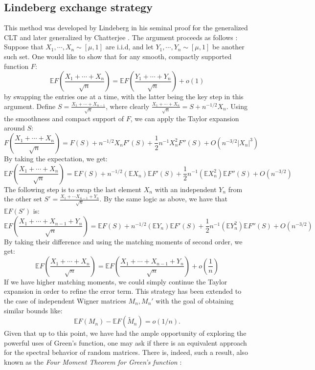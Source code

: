 \documentclass[11pt]{article}
\begin{document}
\subsection{Lindeberg exchange strategy}
This method was developed by Lindeberg in his seminal proof for the generalized CLT \cite{lindeberg} and later generalized by Chatterjee \cite{chatterjee}. The argument proceeds as follows \cite{tao}: Suppose that $X_1, \cdots, X_n\sim [\mu, 1]$ are i.i.d, and let $Y_1, \cdots, Y_n\sim[\mu, 1]$ be another such set. One would like to show that for any smooth, compactly supported function $F$: $$\mathbb{E}F\left(\frac{X_1+\cdots+X_n}{\sqrt{n}}\right) = \mathbb{E}F\left(\frac{Y_1+\cdots+Y_n}{\sqrt{n}}\right)+o(1)$$
by swapping the entries one at a time, with the latter being the key step in this argument.  Define
$S= \frac{X_1+\cdots+X_{n-1}}{\sqrt{n}}$, where clearly $ \frac{X_1+\cdots+X_n}{\sqrt{n}}=S+n^{-1/2}X_n $. Using the smoothness and compact support of $F$, we can apply the Taylor expansion around $S$: $$F\left(\frac{X_1+\cdots+X_n}{\sqrt{n}}\right)=F(S)+n^{-1/2}X_nF'(S)+\frac{1}{2}n^{-1}X_n^2 F''(S) + O(n^{-3/2}|X_n|^3)$$
By taking the expectation, we get: 
$$ \mathbb{E}F\left(\frac{X_1+\cdots+X_n}{\sqrt{n}}\right)=\mathbb{E}F(S)+n^{-1/2}(\mathbb{E}X_n)\mathbb{E}F'(S)+\frac{1}{2}n^{-1}(\mathbb{E}X_n^2)\mathbb{E}F''(S) + O(n^{-3/2})$$
The following step is to swap the last element $X_n$ with an independent $Y_n$ from the other set $S' = \frac{X_1+\cdots X_{n-1}+Y_n}{\sqrt{n}}$. By the same logic as above, we have that $\mathbb{E}F(S')$ is: 
$$ \mathbb{E}F\left(\frac{X_1+\cdots+X_{n-1}+Y_n}{\sqrt{n}}\right)=\mathbb{E}F(S)+n^{-1/2}(\mathbb{E}Y_n)\mathbb{E}F'(S)+\frac{1}{2}n^{-1}(\mathbb{E}Y_n^2)\mathbb{E}F''(S) +O (n^{-3/2})$$
By taking their difference and using the matching moments of second order, we get: 
$$ \mathbb{E}F\left(\frac{X_1+\cdots+X_n}{\sqrt{n}}\right) = \mathbb{E}F\left(\frac{X_1+\cdots+X_{n-1}+Y_n}{\sqrt{n}}\right)+o\left(\frac{1}{n}\right)$$
If we have higher matching moments, we could simply continue the Taylor expansion in order to refine the error term.
This strategy has been extended to the case of independent Wigner matrices $M_n, M_n'$ with the goal of obtaining similar bounds like: $$\mathbb{E}F(M_n)-\mathbb{E}F(\tilde{M}_n)=o(1/n).$$ 
\noindent Given that up to this point, we have had the ample opportunity of exploring the powerful uses of Green's function, one may ask if there is an equivalent approach for the spectral behavior of random matrices. There is, indeed, such a result, also known as the \textit{Four Moment Theorem for Green's function} \cite{tao2}:
\end{document}
